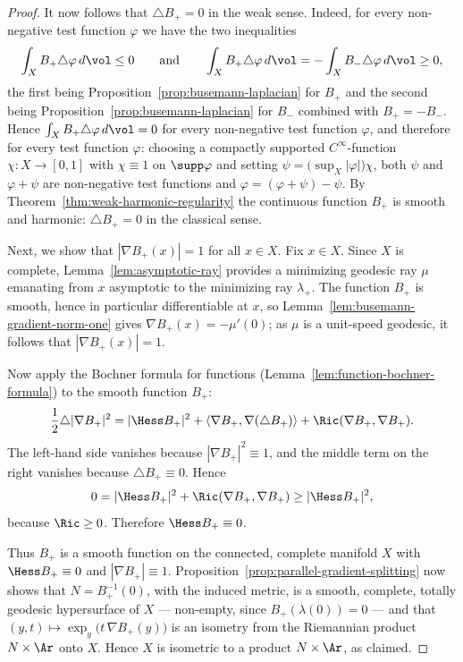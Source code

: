 \begin{proof}
It now follows that $\triangle B_+=0$ in the weak sense. Indeed, for every
non-negative test function $\varphi$ we have the two inequalities
$$\int_X B_+\triangle\varphi\,d\vol\le 0
\qquad\text{and}\qquad
\int_X B_+\triangle\varphi\,d\vol
=-\int_X B_-\triangle\varphi\,d\vol\ge 0,$$
the first being Proposition~\ref{prop:busemann-laplacian} for $B_+$ and the
second being Proposition~\ref{prop:busemann-laplacian} for $B_-$ combined
with $B_+=-B_-$. Hence $\int_X B_+\triangle\varphi\,d\vol=0$ for every
non-negative test function $\varphi$, and therefore for every test function
$\varphi$: choosing a compactly supported $C^\infty$-function
$\chi\colon X\to[0,1]$ with $\chi\equiv 1$ on $\supp\varphi$ and setting
$\psi=\bigl(\sup_X|\varphi|\bigr)\chi$, both $\psi$ and $\varphi+\psi$ are
non-negative test functions and $\varphi=(\varphi+\psi)-\psi$. By
Theorem~\ref{thm:weak-harmonic-regularity} the continuous function $B_+$
is smooth and harmonic: $\triangle B_+=0$ in the classical sense.

Next, we show that $|\nabla B_+(x)|=1$ for all $x\in X$. Fix $x\in X$.
Since $X$ is complete, Lemma~\ref{lem:asymptotic-ray} provides a minimizing
geodesic ray $\mu$ emanating from $x$ asymptotic to the minimizing ray
$\lambda_+$. The function $B_+$ is smooth, hence in particular
differentiable at $x$, so Lemma~\ref{lem:busemann-gradient-norm-one} gives
$\nabla B_+(x)=-\mu'(0)$; as $\mu$ is a unit-speed geodesic, it follows
that $|\nabla B_+(x)|=1$.

Now apply the Bochner formula for functions
(Lemma~\ref{lem:function-bochner-formula}) to the smooth function $B_+$:
$$\frac{1}{2}\triangle|\nabla B_+|^2
=|\Hess B_+|^2+\langle\nabla B_+,\nabla(\triangle B_+)\rangle
+\Ric(\nabla B_+,\nabla B_+).$$
The left-hand side vanishes because $|\nabla B_+|^2\equiv 1$, and the
middle term on the right vanishes because $\triangle B_+\equiv 0$. Hence
$$0=|\Hess B_+|^2+\Ric(\nabla B_+,\nabla B_+)\ge|\Hess B_+|^2,$$
because $\Ric\ge 0$. Therefore $\Hess B_+\equiv 0$.

Thus $B_+$ is a smooth function on the connected, complete manifold $X$
with $\Hess B_+\equiv 0$ and $|\nabla B_+|\equiv 1$.
Proposition~\ref{prop:parallel-gradient-splitting} now shows that
$N=B_+^{-1}(0)$, with the induced metric, is a smooth, complete, totally
geodesic hypersurface of $X$ --- non-empty, since $B_+(\lambda(0))=0$ ---
and that $(y,t)\mapsto \exp_y\bigl(t\,\nabla B_+(y)\bigr)$ is an isometry
from the Riemannian product $N\times\Ar$ onto $X$. Hence $X$ is isometric
to a product $N\times\Ar$, as claimed.
\end{proof}

